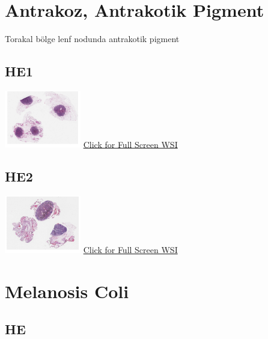\documentclass[
  letterpaper,
  DIV=11,
  numbers=noendperiod]{scrreprt}
\begin{document}
\hypertarget{sec-antrakoz-antrakotik-pigment}{%
\section{Antrakoz, Antrakotik
Pigment}\label{sec-antrakoz-antrakotik-pigment}}

Torakal bölge lenf nodunda antrakotik pigment

\hypertarget{he1}{%
\subsection{HE1}\label{he1}}

\href{https://images.patolojiatlasi.com/anthracosis/HE.html}{\includegraphics[width=0.25\textwidth,height=\textheight]{./screenshots/anthracosis1_screenshot.png}}
\href{https://images.patolojiatlasi.com/anthracosis/HE.html}{Click for
Full Screen WSI}

\hypertarget{he2}{%
\subsection{HE2}\label{he2}}

\href{https://images.patolojiatlasi.com/anthracosis/HE2.html}{\includegraphics[width=0.25\textwidth,height=\textheight]{./screenshots/anthracosis2_screenshot.png}}
\href{https://images.patolojiatlasi.com/anthracosis/HE2.html}{Click for
Full Screen WSI}

\hypertarget{sec-melanosis-coli}{%
\section{Melanosis Coli}\label{sec-melanosis-coli}}

\hypertarget{he-1}{%
\subsection{HE}\label{he-1}}
\end{document}

